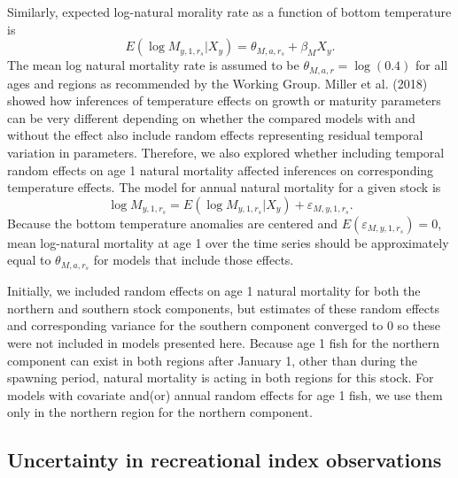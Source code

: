 \documentclass[
]{article}
\begin{document}
Similarly, expected log-natural morality rate as a function of bottom temperature is
\begin{equation}\label{eq:expected-M1}
E\left(\log M_{y,1,r_s}|X_y\right) = \theta_{M,a,r_s} + \beta_{M} X_y.
\end{equation}
The mean log natural mortality rate is assumed to be \(\theta_{M,a,r} = \log(0.4)\) for all ages and regions as recommended by the Working Group. Miller et al. (2018) showed how inferences of temperature effects on growth or maturity parameters can be very different depending on whether the compared models with and without the effect also include random effects representing residual temporal variation in parameters. Therefore, we also explored whether including temporal random effects on age 1 natural mortality affected inferences on corresponding temperature effects. The model for annual natural mortality for a given stock is
\begin{equation}\label{eq:M-re}
\log M_{y,1,r_s} = E\left(\log M_{y,1,r_s}|X_y\right) + \varepsilon_{M,y,1,r_s}.
\end{equation}
Because the bottom temperature anomalies are centered and \(E(\varepsilon_{M,y,1,r_s}) = 0\), mean log-natural mortality at age 1 over the time series should be approximately equal to \(\theta_{M,a,r_s}\) for models that include those effects.

Initially, we included random effects on age 1 natural mortality for both the northern and southern stock components, but estimates of these random effects and corresponding variance for the southern component converged to 0 so these were not included in models presented here. Because age 1 fish for the northern component can exist in both regions after January 1, other than during the spawning period, natural mortality is acting in both regions for this stock. For models with covariate and(or) annual random effects for age 1 fish, we use them only in the northern region for the northern component.

\hypertarget{uncertainty-in-recreational-index-observations}{%
\subsection*{Uncertainty in recreational index observations}\label{uncertainty-in-recreational-index-observations}}
\end{document}
